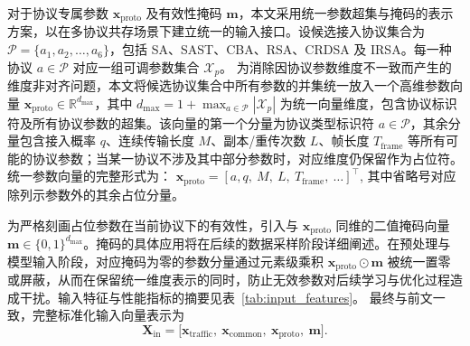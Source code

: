 对于协议专属参数 $\mathbf{x}_{\mathrm{proto}}$ 及有效性掩码 $\mathbf{m}$，本文采用统一参数超集与掩码的表示方案，以在多协议共存场景下建立统一的输入接口。设候选接入协议集合为 $\mathcal{P} = \{a_1, a_2, \ldots, a_6\}$，包括 SA、SAST、CBA、RSA、CRDSA 及 IRSA。每一种协议 $a \in \mathcal{P}$ 对应一组可调参数集合 $\mathcal{X}_p$。
为消除因协议参数维度不一致而产生的维度非对齐问题，本文将候选协议集合中所有参数的并集统一放入一个高维参数向量 $\mathbf{x}_{\mathrm{proto}} \in \mathbb{R}^{d_{\max}}$，其中 $d_{\max} = 1 + \max_{a  \in \mathcal{P}} |\mathcal{X}_p|$ 为统一向量维度，包含协议标识符及所有协议参数的超集。该向量的第一个分量为协议类型标识符 $a \in \mathcal{P}$，其余分量包含接入概率 $q$、连续传输长度 $M$、副本/重传次数 $L$、帧长度 $T_{\mathrm{frame}}$ 等所有可能的协议参数；当某一协议不涉及其中部分参数时，对应维度仍保留作为占位符。统一参数向量的完整形式为：
$\mathbf{x}_{\mathrm{proto}} = [a, q,\ M,\ L,\ T_{\mathrm{frame}},\ \ldots]^{\top}$, 
其中省略号对应除列示参数外的其余占位分量。

为严格刻画占位参数在当前协议下的有效性，引入与 $\mathbf{x}_{\mathrm{proto}}$ 同维的二值掩码向量 $\mathbf{m} \in \{0,1\}^{d_{\max}}$。掩码的具体应用将在后续的数据采样阶段详细阐述。在预处理与模型输入阶段，对应掩码为零的参数分量通过元素级乘积 $\mathbf{x}_{\mathrm{proto}} \odot \mathbf{m}$ 被统一置零或屏蔽，从而在保留统一维度表示的同时，防止无效参数对后续学习与优化过程造成干扰。输入特征与性能指标的摘要见表~\ref{tab:input_features}。
最终与前文一致，完整标准化输入向量表示为
\begin{equation}
\mathbf{X}_{\mathrm{in}} = \big[\mathbf{x}_{\text{traffic}},\ \mathbf{x}_{\mathrm{common}},\ \mathbf{x}_{\mathrm{proto}},\ \mathbf{m}\big].
\end{equation}


